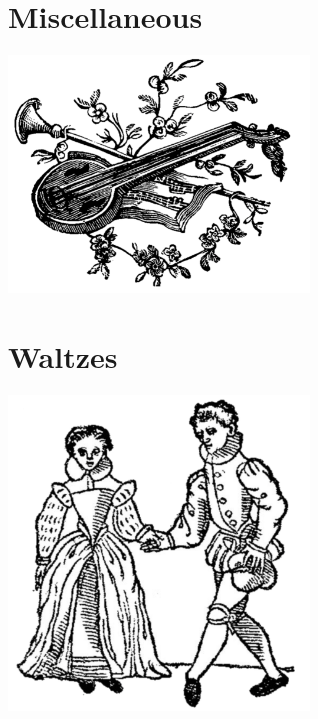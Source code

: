 \documentclass[12pt]{report}
\begin{document}
\chapter{Miscellaneous}
\begin{center}
\includegraphics[width=8cm]{../images/misc}
\end{center}

\chapter{Waltzes}
\begin{center}
\includegraphics[width=8cm]{../images/waltzes}
\end{center}


\end{document}
